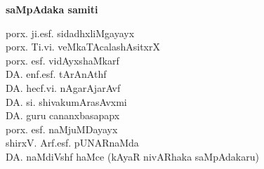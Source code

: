 \begin{center}
{\Large\bf saMpAdaka samiti}

\bigskip
{\fontsize{13pt}{15pt}\selectfont
porx. ji.esf. sidadhxliMgayayx\\[6pt]
porx. Ti.vi. veMkaTAcalashAsitxrX\\[6pt]
porx. esf. vidAyxshaMkarf\\[6pt]
DA. enf.esf. tArAnAthf\\[6pt]
DA. hecf.vi. nAgarAjarAvf\\[6pt]
DA. si. shivakumArasAvxmi\\[6pt]
DA. guru cananxbasapapx\\[6pt]
porx. esf. naMjuMDayayx\\[6pt]
shirxV. Arf.esf. pUNARnaMda\\[6pt]
DA. naMdiVshf haMce (kAyaR nivARhaka saMpAdakaru)}\relax
\end{center}

\vfill

\phantom{a}







